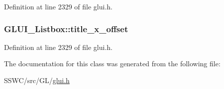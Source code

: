 Definition at line 2329 of file glui.\+h.

\hypertarget{class_g_l_u_i___listbox_a4bc9d6c3e849e840b0f61eb446ecba95}{
\subsubsection[{title\+\_\+x\+\_\+offset}]{ G\+L\+U\+I\+\_\+\+Listbox\+::title\+\_\+x\+\_\+offset}}\label{class_g_l_u_i___listbox_a4bc9d6c3e849e840b0f61eb446ecba95}


Definition at line 2329 of file glui.\+h.



The documentation for this class was generated from the following file\+:\begin{DoxyCompactItemize}
\item 
S\+S\+W\+C/src/\+G\+L/\hyperlink{glui_8h}{glui.\+h}\end{DoxyCompactItemize}

